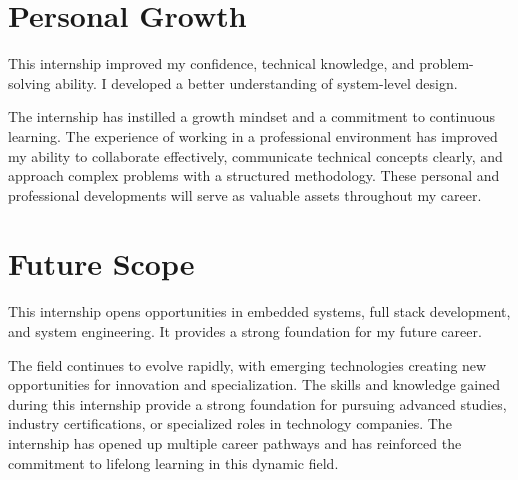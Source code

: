 \documentclass[12pt,a4paper]{report}
\begin{document}
\section{Personal Growth}

This internship improved my confidence, technical knowledge, and problem-solving ability. I developed a better understanding of system-level design.


The internship has instilled a growth mindset and a commitment to continuous learning. The experience of working in a professional environment has improved my ability to collaborate effectively, communicate technical concepts clearly, and approach complex problems with a structured methodology. These personal and professional developments will serve as valuable assets throughout my career.


\section{Future Scope}

This internship opens opportunities in embedded systems, full stack development, and system engineering. It provides a strong foundation for my future career.


The field continues to evolve rapidly, with emerging technologies creating new opportunities for innovation and specialization. The skills and knowledge gained during this internship provide a strong foundation for pursuing advanced studies, industry certifications, or specialized roles in technology companies. The internship has opened up multiple career pathways and has reinforced the commitment to lifelong learning in this dynamic field.
\end{document}
